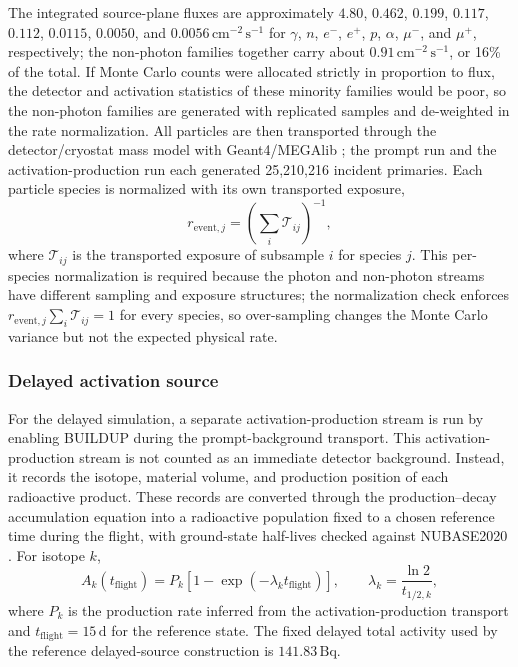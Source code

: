 \documentclass[11pt]{article}
\begin{document}
The integrated source-plane fluxes are approximately $4.80$, $0.462$, $0.199$,
$0.117$, $0.112$, $0.0115$, $0.0050$, and $0.0056\,\mathrm{cm^{-2}\,s^{-1}}$
for $\gamma$, $n$, $e^-$, $e^+$, $p$, $\alpha$, $\mu^-$, and $\mu^+$,
respectively; the non-photon families together carry about
$0.91\,\mathrm{cm^{-2}\,s^{-1}}$, or 16\% of the total. If Monte Carlo counts
were allocated strictly in proportion to flux, the detector and activation
statistics of these minority families would be poor, so the non-photon
families are generated with replicated samples and de-weighted in the rate
normalization. All particles are then transported through the
detector/cryostat mass model with Geant4/MEGAlib
\cite{Agostinelli2003,Allison2016,Zoglauer2006}; the prompt run and the
activation-production run each generated 25,210,216 incident primaries. Each
particle species is normalized with its own transported exposure,
\begin{equation}
  r_{\mathrm{event},j}=\left(\sum_i \mathcal{T}_{ij}\right)^{-1},
\end{equation}
where $\mathcal{T}_{ij}$ is the transported exposure of subsample $i$ for
species $j$. This per-species normalization is required because the photon and
non-photon streams have different sampling and exposure structures; the
normalization check enforces $r_{\mathrm{event},j}\sum_i\mathcal{T}_{ij}=1$
for every species, so over-sampling changes the Monte Carlo variance but not
the expected physical rate.

\subsubsection{Delayed activation source}
\label{subsec:delayed_source}

For the delayed simulation, a separate activation-production stream is run by
enabling BUILDUP during the prompt-background transport. This
activation-production stream is not counted as an immediate detector background.
Instead, it records the isotope, material volume, and production position of
each radioactive product. These records are converted through the
production--decay accumulation equation into a radioactive population fixed to a
chosen reference time during the flight, with ground-state half-lives checked
against NUBASE2020 \cite{Kondev2021NUBASE}. For isotope $k$,
\begin{equation}
  A_k(t_{\mathrm{flight}}) = P_k\left[1-\exp\left(-\lambda_k t_{\mathrm{flight}}\right)\right],
  \qquad \lambda_k = \frac{\ln 2}{t_{1/2,k}},
\end{equation}
where $P_k$ is the production rate inferred from the activation-production
transport and $t_{\mathrm{flight}}=15\,\mathrm{d}$ for the reference state.
The fixed delayed total activity used by the reference delayed-source
construction is $141.83\,\mathrm{Bq}$.
\end{document}
